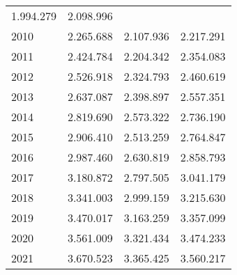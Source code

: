 \begin{tabular}{llll}
  \multicolumn{1}{r}{1.994.279} &
  \multicolumn{1}{r}{2.098.996} \\
\multicolumn{1}{l}{\hspace{1em}2010} &
  \multicolumn{1}{|r}{2.265.688} &
  \multicolumn{1}{r}{2.107.936} &
  \multicolumn{1}{r}{2.217.291} \\
\multicolumn{1}{l}{\hspace{1em}2011} &
  \multicolumn{1}{|r}{2.424.784} &
  \multicolumn{1}{r}{2.204.342} &
  \multicolumn{1}{r}{2.354.083} \\
\multicolumn{1}{l}{\hspace{1em}2012} &
  \multicolumn{1}{|r}{2.526.918} &
  \multicolumn{1}{r}{2.324.793} &
  \multicolumn{1}{r}{2.460.619} \\
\multicolumn{1}{l}{\hspace{1em}2013} &
  \multicolumn{1}{|r}{2.637.087} &
  \multicolumn{1}{r}{2.398.897} &
  \multicolumn{1}{r}{2.557.351} \\
\multicolumn{1}{l}{\hspace{1em}2014} &
  \multicolumn{1}{|r}{2.819.690} &
  \multicolumn{1}{r}{2.573.322} &
  \multicolumn{1}{r}{2.736.190} \\
\multicolumn{1}{l}{\hspace{1em}2015} &
  \multicolumn{1}{|r}{2.906.410} &
  \multicolumn{1}{r}{2.513.259} &
  \multicolumn{1}{r}{2.764.847} \\
\multicolumn{1}{l}{\hspace{1em}2016} &
  \multicolumn{1}{|r}{2.987.460} &
  \multicolumn{1}{r}{2.630.819} &
  \multicolumn{1}{r}{2.858.793} \\
\multicolumn{1}{l}{\hspace{1em}2017} &
  \multicolumn{1}{|r}{3.180.872} &
  \multicolumn{1}{r}{2.797.505} &
  \multicolumn{1}{r}{3.041.179} \\
\multicolumn{1}{l}{\hspace{1em}2018} &
  \multicolumn{1}{|r}{3.341.003} &
  \multicolumn{1}{r}{2.999.159} &
  \multicolumn{1}{r}{3.215.630} \\
\multicolumn{1}{l}{\hspace{1em}2019} &
  \multicolumn{1}{|r}{3.470.017} &
  \multicolumn{1}{r}{3.163.259} &
  \multicolumn{1}{r}{3.357.099} \\
\multicolumn{1}{l}{\hspace{1em}2020} &
  \multicolumn{1}{|r}{3.561.009} &
  \multicolumn{1}{r}{3.321.434} &
  \multicolumn{1}{r}{3.474.233} \\
\multicolumn{1}{l}{\hspace{1em}2021} &
  \multicolumn{1}{|r}{3.670.523} &
  \multicolumn{1}{r}{3.365.425} &
  \multicolumn{1}{r}{3.560.217} \\
\cline{1-4}
\end{tabular}
